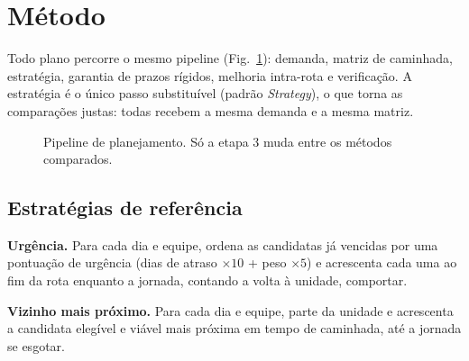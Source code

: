 \documentclass[conference,a4paper]{IEEEtran}
\begin{document}
\section{Método}\label{sec:metodo}

Todo plano percorre o mesmo pipeline (Fig.~\ref{fig:pipeline}): demanda, matriz de caminhada, estratégia, garantia de prazos rígidos, melhoria intra-rota e verificação. A estratégia é o único passo substituível (padrão \emph{Strategy}), o que torna as comparações justas: todas recebem a mesma demanda e a mesma matriz.

\begin{figure}[t]
\centering
{}
\caption{Pipeline de planejamento. Só a etapa 3 muda entre os métodos comparados.}
\label{fig:pipeline}
\end{figure}

\subsection{Estratégias de referência}

\textbf{Urgência.} Para cada dia e equipe, ordena as candidatas já vencidas por uma pontuação de urgência (dias de atraso $\times 10$ + peso $\times 5$) e acrescenta cada uma ao fim da rota enquanto a jornada, contando a volta à unidade, comportar.

\textbf{Vizinho mais próximo.} Para cada dia e equipe, parte da unidade e acrescenta a candidata elegível e viável mais próxima em tempo de caminhada, até a jornada se esgotar.
\end{document}
